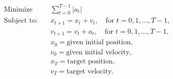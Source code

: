 \documentclass{article}
\begin{document}
\begin{align*}
\text{Minimize} \quad & \sum_{t=0}^{T-1} |a_t| \\
\text{Subject to:} \quad
& x_{t+1} = x_t + v_t, \quad \text{for } t = 0, 1, \ldots, T-1, \\
& v_{t+1} = v_t + a_t, \quad \text{for } t = 0, 1, \ldots, T-1, \\
& x_0 = \text{given initial position}, \\
& v_0 = \text{given initial velocity}, \\
& x_T = \text{target position}, \\
& v_T = \text{target velocity}.
\end{align*}
\end{document}
